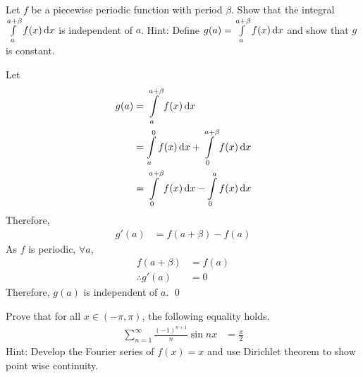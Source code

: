 \documentclass[fleqn, a4paper, 11pt, oneside]{amsart}
\theoremstyle{definition}
\theoremstyle{theorem}
\begin{document}
\begin{question}
	Let $f$ be a piecewise periodic function with period $\beta$.
	Show that the integral $\int\limits_{a}^{a + \beta} f(x) \dif x$ is independent of $a$.
	Hint: Define $g(a) = \int\limits_{a}^{a + \beta} f(x) \dif x$ and show that $g$ is constant.
\end{question}

\begin{solution}
	Let
	\begin{align*}
		g(a) & = \int\limits_{a}^{a + \beta} f(x) \dif x                                   \\
                     & = \int\limits_{a}^{0} f(x) \dif x + \int\limits_{0}^{a + \beta} f(x) \dif x \\
                     & = \int\limits_{0}^{a + \beta} f(x) \dif x - \int\limits_{0}^{a} f(x) \dif x
	\end{align*}
	Therefore,
	\begin{align*}
		g'(a) & = f(a + \beta) - f(a)
	\end{align*}
	As $f$ is periodic, $\forall a$,
	\begin{align*}
		f(a + \beta)     & = f(a) \\
		\therefore g'(a) & = 0
	\end{align*}
	Therefore, $g(a)$ is independent of $a$.
	\qed
\end{solution}

\begin{question}
	Prove that for all $x \in (-\pi,\pi)$, the following equality holds.
	\begin{align*}
		\sum\limits_{n = 1}^{\infty} \frac{(-1)^{n + 1}}{n} \sin n x & = \frac{x}{2}
	\end{align*}
	Hint: Develop the Fourier series of $f(x) = x$ and use Dirichlet theorem to show point wise continuity.
\end{question}
\end{document}

